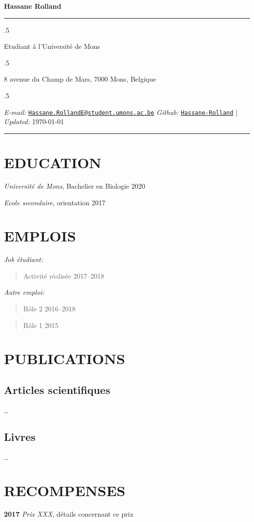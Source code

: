 \documentclass[10pt,]{article}
\begin{document}
\centerline{\huge \bf Hassane Rolland}

\vspace{2 mm}

\hrule

\vspace{2 mm}

\moveleft.5\hoffset\centerline{Etudiant à l'Université de Mons}
\moveleft.5\hoffset\centerline{8 avenue du Champ de Mars, 7000 Mons, Belgique}
\moveleft.5\hoffset\centerline{ \emph{E-mail:} \href{mailto:}{\tt \href{mailto:Hassane.RollandE@student.umons.ac.be}{\nolinkurl{Hassane.RollandE@student.umons.ac.be}}} \hspace{1 mm}  \emph{Github:} \href{http://github.com/Hassane-Rolland}{\tt Hassane-Rolland} \hspace{1 mm}      | \emph{Updated:} \today}

\vspace{2 mm}

\hrule


\section{EDUCATION}\label{education}

\emph{Université de Mons}, Bachelier en Biologie \hfill 2020

\emph{Ecole secondaire}, orientation \hfill 2017

\section{EMPLOIS}\label{emplois}

\emph{Job étudiant:}

\begin{quote}
Activité réalisée \hfill 2017--2018
\end{quote}

\emph{Autre emploi:}

\begin{quote}
Rôle 2 \hfill 2016--2018
\end{quote}

\begin{quote}
Rôle 1 \hfill 2015
\end{quote}

\section{PUBLICATIONS}\label{publications}

\subsection{\texorpdfstring{\textbf{Articles
scientifiques}}{Articles scientifiques}}\label{articles-scientifiques}

\ldots{}

\subsection{\texorpdfstring{\textbf{Livres}}{Livres}}\label{livres}

\ldots{}

\section{RECOMPENSES}\label{recompenses}

\textbf{2017} \emph{Prix XXX}, détails concernant ce prix
\end{document}
